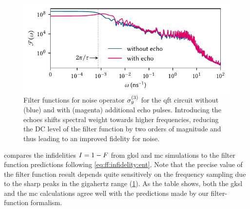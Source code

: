\begin{figure}
    \centering
    \includegraphics{img/pdf/filter_functions/qft_filter_function_Y3}
    \caption[]{
        Filter functions for noise operator $\sigma_y\gth{3}$ for the \gls{qft} circuit without (blue) and with (magenta) additional echo pulses.
        Introducing the echoes shifts spectral weight towards higher frequencies, reducing the DC level of the filter function by two orders of magnitude and thus leading to an improved fidelity for \oneoverf noise.
    }
    \label{fig:app:qft_ff}
\end{figure}
\begin{table}
    \centering
    \renewcommand\arraystretch{1.25}
    \caption{
        Infidelities $\avginfid = 1-\avgfid$ of the \gls{qft} circuit due to noise on $\sigma_y\gth{3}$.
        \Gls{mc} values are averages over $N=1000$ random traces and have a relative error of \qty{3}{\percent}.
        We included frequencies in the range of $\omega\in [0, 100]\,\unit{\per\nano\second}$ for white noise, and $\omega\in [\qty{100}{\per\milli\second}, \qty{100}{\per\nano\second}]$ for pink noise.
        \Gls{ff} values are computed with $n_\omega=1000$ samples logarithmically distributed over the same interval.
        Prefactors in the power law $S(\omega)= A\omega^\alpha$ are \qty{2e-6}{\per\nano\second} and \qty{1e-9}{\per\nano\second\squared}, respectively.
    }
    \label{tab:app:fidelities}
    
\end{table}

 compares the infidelities $I=1-F$ from \gls{gksl} and \gls{mc} simulations to the filter function predictions following \cref{eq:ff:infidelity:ent}.
Note that the precise value of the filter function result depends quite sensitively on the frequency sampling due to the sharp peaks in the gigahertz range (\cref{fig:app:qft_ff}).
As the table shows, both the \gls{gksl} and the \gls{mc} calculations agree well with the predictions made by our filter-function formalism.

